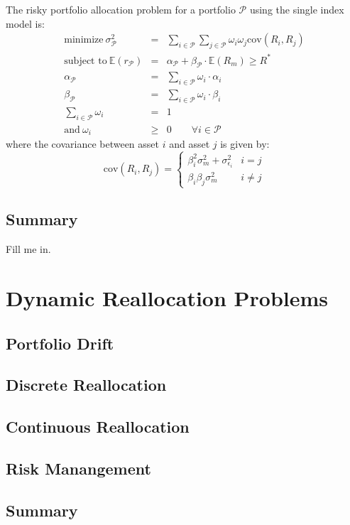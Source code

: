 \documentclass[11pt]{article}
\theoremstyle{definition}
\begin{document}
The risky portfolio allocation problem for a portfolio $\mathcal{P}$ using the single index model is:
\begin{eqnarray*}
\text{minimize}~\sigma_{\mathcal{P}}^2 &=& \sum_{i\in\mathcal{P}}\sum_{j\in\mathcal{P}}\omega_{i}\omega_{j}
\text{cov}\left(R_{i},R_{j}\right) \\
\text{subject to}~\mathbb{E}(r_{\mathcal{P}})& = & \alpha_{\mathcal{P}}+\beta_{\mathcal{P}}\cdot\mathbb{E}(R_{m})\geq{R^{*}} \\
\alpha_{\mathcal{P}} & = & \sum_{i\in\mathcal{P}}\omega_{i}\cdot\alpha_{i}\\
\beta_{\mathcal{P}} & = & \sum_{i\in\mathcal{P}}\omega_{i}\cdot\beta_{i} \\
\sum_{i\in\mathcal{P}}\omega_{i} & = & 1 \\
\text{and}~\omega_{i}&\geq&{0}\qquad{\forall{i}\in\mathcal{P}}
\end{eqnarray*}
where the covariance between asset $i$ and asset $j$ is given by:
\begin{equation*}
\text{cov}(R_{i}, R_{j}) = \begin{cases}
\beta_{i}^{2}\sigma_{m}^{2}+\sigma_{\epsilon_{i}}^{2} & i = j \\
\beta_{i}\beta_{j}\sigma_{m}^2 & i \neq j
\end{cases}
\end{equation*}

\subsection{Summary}
Fill me in.

\section{Dynamic Reallocation Problems}\label{sec:dynamic-reallocation-problems-portfolios}
\subsection{Portfolio Drift}\label{subsec:portfolio-drift}
\subsection{Discrete Reallocation}\label{subsec:discrete-time-reallocation-min-var-portfolio}
\subsection{Continuous Reallocation}\label{subsec:continuous-time-reallocation-min-var-portfolio}
\subsection{Risk Manangement}\label{sec:risk-management-portfolios}
\subsection{Summary}\label{sec:summary-min-var-portfolio}


\clearpage



\clearpage
\printindex
\end{document}
